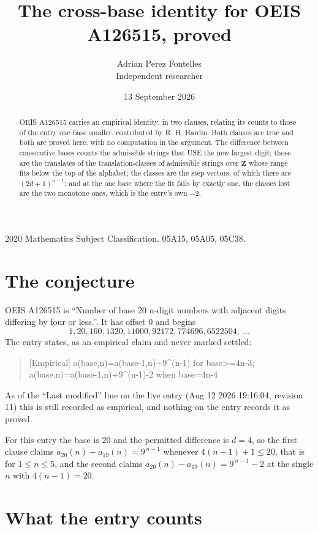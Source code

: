 \documentclass[11pt,a4paper]{article}
\title{The cross-base identity for OEIS A126515, proved}
\author{Adrian Perez Fontelles\\ \small Independent researcher}
\date{13 September 2026}
\theoremstyle{plain}
\theoremstyle{definition}
\begin{document}
\maketitle

\begin{abstract}
OEIS A126515 carries an empirical identity, in two clauses, relating its counts to those of the
entry one base smaller, contributed by R. H. Hardin. Both clauses are true and both are proved
here, with no computation in the argument. The difference between consecutive bases counts the
admissible strings that USE the new largest digit; those are the translates of the
translation-classes of admissible strings over $\mathbf{Z}$ whose range fits below the top of
the alphabet; the classes are the step vectors, of which there are $(2d+1)^{n-1}$; and at the
one base where the fit fails by exactly one, the classes lost are the two monotone ones, which
is the entry's own $-2$.
\end{abstract}

\noindent\small 2020 Mathematics Subject Classification. 05A15, 05A05, 05C38.\normalsize

\section{The conjecture}

OEIS A126515 is ``Number of base 20 n-digit numbers with adjacent digits differing by four or less.''. It has offset $0$ and begins
\[
1, 20, 160, 1320, 11000, 92172, 774696, 6522504,\ \dots
\]
The entry states, as an empirical claim and never marked settled:
\begin{quote}
[Empirical] a(base,n)=a(base-1,n)+9\textasciicircum{}(n-1) for base>=4n-3; a(base,n)=a(base-1,n)+9\textasciicircum{}(n-1)-2 when base=4n-4
\end{quote}
As of the ``Last modified'' line on the live entry (Aug 12 2026 19:16:04, revision 11)
this is still recorded as empirical, and nothing on the entry records it as proved.

For this entry the base is $20$ and the permitted difference is $d=4$, so the first clause
claims $a_{20}(n)-a_{19}(n)=9^{\,n-1}$ whenever $4(n-1)+1\le20$, that is for
$1\le n\le5$, and the second claims $a_{20}(n)-a_{19}(n)=9^{\,n-1}-2$ at the single
$n$ with $4(n-1)=20$.

\section{What the entry counts}
\end{document}
